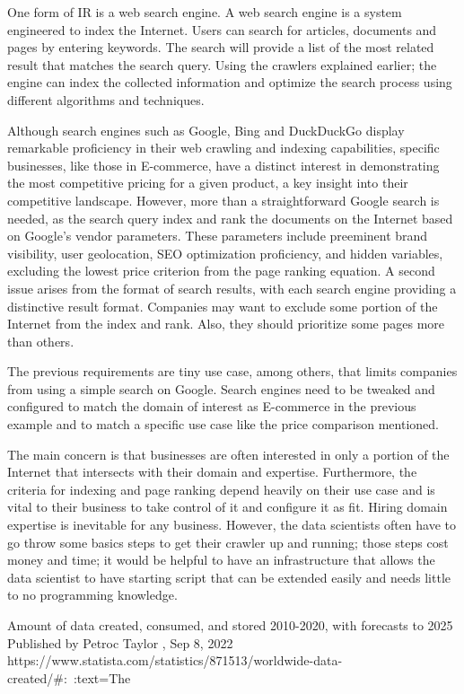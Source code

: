 One form of IR is a web search engine. A web search engine is a system engineered to index the Internet. Users can search for articles, documents and pages by entering keywords. The search will provide a list of the most related result that matches the search query. Using the crawlers explained earlier; the engine can index the collected information and optimize the search process using different algorithms and techniques. 
 
Although search engines such as Google, Bing and DuckDuckGo display remarkable proficiency in their web crawling and indexing capabilities, specific businesses, like those in E-commerce, have a distinct interest in demonstrating the most competitive pricing for a given product, a key insight into their competitive landscape. However, more than a straightforward Google search is needed, as the search query index and rank the documents on the Internet based on Google's vendor parameters. These parameters include preeminent brand visibility, user geolocation, SEO optimization proficiency, and hidden variables, excluding the lowest price criterion from the page ranking equation. A second issue arises from the format of search results, with each search engine providing a distinctive result format. Companies may want to exclude some portion of the Internet from the index and rank. Also, they should prioritize some pages more than others.

The previous requirements are tiny use case, among others, that limits companies from using a simple search on Google. Search engines need to be tweaked and configured to match the domain of interest as E-commerce in the previous example and to match a specific use case like the price comparison mentioned.

The main concern is that businesses are often interested in only a portion of the Internet that intersects with their domain and expertise. Furthermore, the criteria for indexing and page ranking depend heavily on their use case and is vital to their business to take control of it and configure it as fit. Hiring domain expertise is inevitable for any business. However, the data scientists often have to go throw some basics steps to get their crawler up and running; those steps cost money and time; it would be helpful to have an infrastructure that allows the data scientist to have starting script that can be extended easily and needs little to no programming knowledge. 




Amount of data created, consumed, and stored 2010-2020, with forecasts to 2025
Published by 
Petroc Taylor
, Sep 8, 2022
https://www.statista.com/statistics/871513/worldwide-data-created/#:~:text=The%
